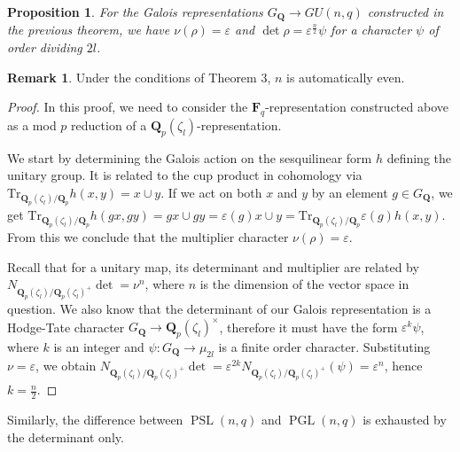 \documentclass{article}
\newtheorem{proposition}[theorem]{Proposition}
\theoremstyle{definition}
\newtheorem*{remark}{Remark}
\DeclareMathOperator{\PGL}{\mathrm{PGL}}
\DeclareMathOperator{\PSL}{\mathrm{PSL}}
\begin{document}
 	\begin{proposition}
 		For the Galois representations $G_{\mathbf{Q}} \to GU(n,q)$ constructed in the previous theorem, we have $\nu(\rho) = \varepsilon$ and $\det \rho = \varepsilon^{\frac{n}{2}} \psi$ for a character $\psi$ of order dividing $2l$.
 	\end{proposition}
 	\begin{remark}
 		Under the conditions of Theorem 3, $n$ is automatically even.
 	\end{remark}
 	\begin{proof}
 		In this proof, we need to consider the $\mathbf{F}_q$-representation constructed above as a mod $p$ reduction of a $\mathbf{Q}_p(\zeta_l)$-representation. \par
 		We start by determining the Galois action on the sesquilinear form $h$ defining the unitary group. It is related to the cup product in cohomology via $\mathrm{Tr}_{\mathbf{Q}_p(\zeta_l) / \mathbf{Q}_p} h(x,y) = x \cup y$. If we act on both $x$ and $y$ by an element $g \in G_{\mathbf{Q}}$, we get $\mathrm{Tr}_{\mathbf{Q}_p(\zeta_l) / \mathbf{Q}_p} h(gx,gy) = gx \cup gy = \varepsilon(g) x \cup y = \mathrm{Tr}_{\mathbf{Q}_p(\zeta_l) / \mathbf{Q}_p} \varepsilon(g) h(x,y)$. From this we conclude that the multiplier character $\nu(\rho) = \varepsilon$. \par 
 		Recall that for a unitary map, its determinant and multiplier are related by $N_{\mathbf{Q}_p(\zeta_l)/\mathbf{Q}_p(\zeta_l)^+} \det = \nu^n$, where $n$ is the dimension of the vector space in question. We also know that the determinant of our Galois representation is a Hodge-Tate character $G_{\mathbf{Q}} \to \mathbf{Q}_p(\zeta_l)^{\times}$, therefore it must have the form $\varepsilon^k \psi$, where $k$ is an integer and $\psi : G_{\mathbf{Q}} \to \mu_{2l}$ is a finite order character. Substituting $\nu = \varepsilon$, we obtain $N_{\mathbf{Q}_p(\zeta_l)/\mathbf{Q}_p(\zeta_l)^+} \det = \varepsilon^{2k}N_{\mathbf{Q}_p(\zeta_l)/\mathbf{Q}_p(\zeta_l)^+} (\psi) = \varepsilon^n$, hence $k = \frac{n}{2}$. 
 	\end{proof}
 	
 	Similarly, the difference between $\PSL(n, q)$ and $\PGL(n, q)$ is exhausted by the determinant only. 
 	
\end{document}
